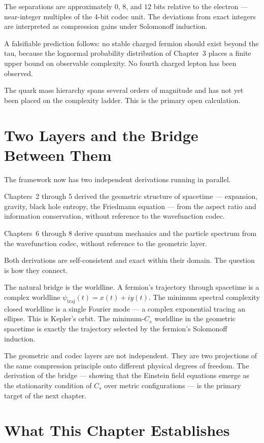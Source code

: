 The separations are approximately $0$, $8$, and $12$ bits relative to
the electron --- near-integer multiples of the 4-bit codec unit. The
deviations from exact integers are interpreted as compression gains
under Solomonoff induction.

A falsifiable prediction follows: no stable charged fermion should
exist beyond the tau, because the lognormal probability distribution
of Chapter~3 places a finite upper bound on observable complexity. No
fourth charged lepton has been observed.

The quark mass hierarchy spans several orders of magnitude and has
not yet been placed on the complexity ladder. This is the primary open
calculation.

\section{Two Layers and the Bridge Between Them}

The framework now has two independent derivations running in parallel.

Chapters~2 through 5 derived the geometric structure of spacetime ---
expansion, gravity, black hole entropy, the Friedmann equation ---
from the aspect ratio and information conservation, without reference
to the wavefunction codec.

Chapters~6 through 8 derive quantum mechanics and the particle
spectrum from the wavefunction codec, without reference to the
geometric layer.

Both derivations are self-consistent and exact within their domain.
The question is how they connect.

The natural bridge is the worldline. A fermion's trajectory through
spacetime is a complex worldline $\psi_{\mathrm{traj}}(t) = x(t) + iy(t)$.
The minimum spectral complexity closed worldline is a single
Fourier mode --- a complex exponential tracing an ellipse. This is
Kepler's orbit. The minimum-$C_s$ worldline in the geometric spacetime
is exactly the trajectory selected by the fermion's Solomonoff
induction.

The geometric and codec layers are not independent. They are two
projections of the same compression principle onto different physical
degrees of freedom. The derivation of the bridge --- showing that the
Einstein field equations emerge as the stationarity condition of $C_s$
over metric configurations --- is the primary target of the next
chapter.

\section{What This Chapter Establishes}


